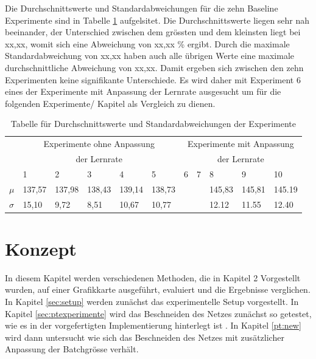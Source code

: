 Die Durchschnittswerte und Standardabweichungen für die zehn Baseline Experimente sind in Tabelle \ref{tab:baseline} aufgelsitet. Die Durchschnittswerte liegen sehr nah beeinander, der Unterschied zwischen dem grössten und dem kleinsten liegt bei xx,xx, womit sich eine Abweichung von xx,xx \% ergibt. Durch die maximale Standardabweichung von xx,xx haben auch alle übrigen Werte eine maximale durchschnittliche Abweichung von xx,xx. Damit ergeben sich zwischen den zehn Experimenten keine signifikante Unterschiede. Es wird daher mit Experiment 6 eines der Experimente mit Anpassung der Lernrate ausgesucht um für die folgenden Experimente/ Kapitel als Vergleich zu dienen.
\begin{table}[h]
\begin{tabular}{|l|l|l|l|l|l|l|l|l|l|l|} \hline
           & \multicolumn{5}{c|}{Experimente ohne Anpassung}&\multicolumn{5}{c|}{Experimente mit Anpassung} \\
           &\multicolumn{5}{c|}{der Lernrate} &\multicolumn{5}{c|}{der Lernrate}\\
           & 1       & 2      & 3      & 4       & 5       & 6   & 7 & 8      & 9      & 10 \\ \hline 
$\mu$      & 137,57  & 137,98 & 138,43 & 139,14  & 138,73  &     &   & 145,83 & 145,81 & 145.19  \\ \hline
$\sigma$   & 15,10   & 9,72   & 8,51   & 10,67   & 10,77   &     &   & 12.12  & 11.55  & 12.40  \\ \hline
\end{tabular}
\caption{Tabelle für Durchschnittswerte und Standardabweichungen der Experimente}
\label{tab:baseline}
\end{table}

\section{Konzept}\label{sec:konzept}




In diesem Kapitel werden verschiedenen Methoden, die in Kapitel 2 Vorgestellt wurden, auf einer Grafikkarte ausgeführt, evaluiert und die Ergebnisse verglichen. In Kapitel \ref{sec:setup} werden zunächst das experimentelle Setup vorgestellt. In Kapitel \ref{sec:ptexperimente} wird das Beschneiden des Netzes zunächst so getestet, wie es in der vorgefertigten Implementierung hinterlegt ist \cite{ptImpl}. In Kapitel \ref{pt:new} wird dann untersucht wie sich das Beschneiden des Netzes mit zusätzlicher Anpassung der Batchgrösse verhält.

